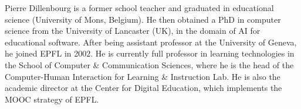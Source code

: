 \documentclass[10pt,journal,compsoc]{IEEEtran}
\begin{document}
\begin{IEEEbiography}{Pierre Dillenbourg} is a former school teacher and graduated in educational science (University of Mons, Belgium). He then obtained a PhD in computer science from the University of Lancaster (UK), in the domain of AI for educational software. After being assistant professor at the University of Geneva, he joined EPFL in 2002. He is currently full professor in learning technologies in the School of Computer \& Communication Sciences, where he is the head of the Computer-Human Interaction for Learning \& Instruction Lab. He is also the academic director at the Center for Digital Education, which implements the MOOC strategy of EPFL.
\end{IEEEbiography}






\end{document}
